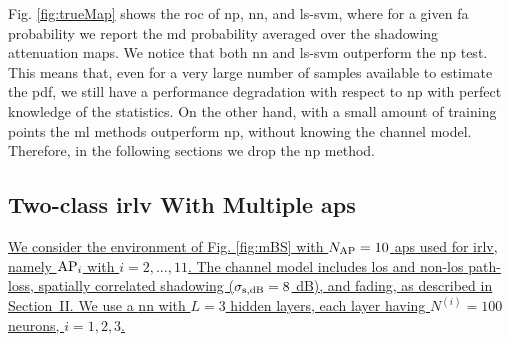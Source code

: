 \documentclass[final,twocolumn]{IEEEtran}
\begin{document}
Fig. \ref{fig:trueMap} shows the \ac{roc}  of \ac{np}, \ac{nn}, and \ac{ls}-\ac{svm}, where for a given \ac{fa} probability we report the  \ac{md} probability averaged over the shadowing attenuation maps. We notice that both \ac{nn} and \ac{ls}-\ac{svm} outperform the \ac{np} test. This means that, even for a very large number of samples available to estimate the \ac{pdf}, we still have a performance degradation with respect to \ac{np} with perfect knowledge of the statistics. On the other hand, with a small amount of training points the \ac{ml} methods outperform \ac{np}, without knowing the channel model. Therefore, in the following sections we drop the \ac{np} method.
 




\subsection{Two-class \ac{irlv} With Multiple \acp{ap}}
\label{sec:res_fading}

\uline{We consider the environment of Fig. \ref{fig:mBS} with $N_{\rm AP}=10$ \acp{ap} used for \ac{irlv}, namely ${\rm AP}_i$ with $i = 2,\dots,11$. The channel model includes \ac{los} and non-\ac{los} path-loss, spatially correlated shadowing ($\sigma_{\rm s, dB} = 8$ dB), and fading, as described in Section~II. We use a \ac{nn} with $L=3$ hidden layers, each layer having $N^{(i)} = 100$ neurons, $i = 1,2,3$.}  
\end{document}

